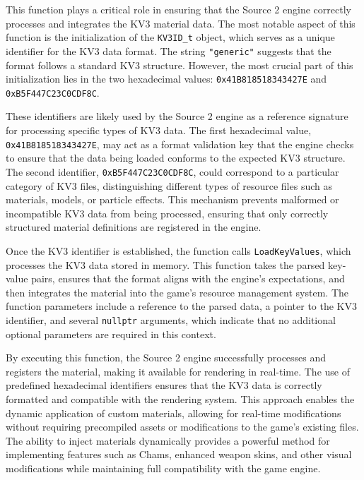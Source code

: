 This function plays a critical role in ensuring that the Source 2 engine correctly processes and integrates the KV3 material data. The most notable aspect of this function is the initialization of the \texttt{KV3ID\_t} object, which serves as a unique identifier for the KV3 data format. The string \texttt{"generic"} suggests that the format follows a standard KV3 structure. However, the most crucial part of this initialization lies in the two hexadecimal values: \texttt{0x41B818518343427E} and \texttt{0xB5F447C23C0CDF8C}.  

These identifiers are likely used by the Source 2 engine as a reference signature for processing specific types of KV3 data. The first hexadecimal value, \texttt{0x41B818518343427E}, may act as a format validation key that the engine checks to ensure that the data being loaded conforms to the expected KV3 structure. The second identifier, \texttt{0xB5F447C23C0CDF8C}, could correspond to a particular category of KV3 files, distinguishing different types of resource files such as materials, models, or particle effects. This mechanism prevents malformed or incompatible KV3 data from being processed, ensuring that only correctly structured material definitions are registered in the engine.  

Once the KV3 identifier is established, the function calls \texttt{LoadKeyValues}, which processes the KV3 data stored in memory. This function takes the parsed key-value pairs, ensures that the format aligns with the engine's expectations, and then integrates the material into the game’s resource management system. The function parameters include a reference to the parsed data, a pointer to the KV3 identifier, and several \texttt{nullptr} arguments, which indicate that no additional optional parameters are required in this context.  

By executing this function, the Source 2 engine successfully processes and registers the material, making it available for rendering in real-time. The use of predefined hexadecimal identifiers ensures that the KV3 data is correctly formatted and compatible with the rendering system. This approach enables the dynamic application of custom materials, allowing for real-time modifications without requiring precompiled assets or modifications to the game’s existing files. The ability to inject materials dynamically provides a powerful method for implementing features such as Chams, enhanced weapon skins, and other visual modifications while maintaining full compatibility with the game engine.




